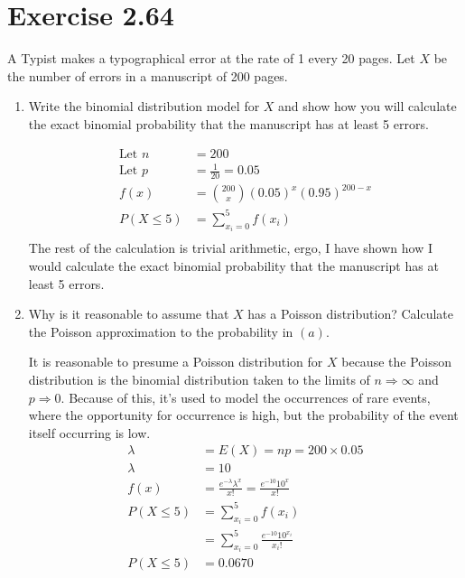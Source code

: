 \documentclass{article}
\begin{document}
\section*{Exercise 2.64}
	A Typist makes a typographical error at the rate of 1 every 20 pages. Let $X$ be the number of errors in a manuscript of 200 pages.
	\begin{enumerate}[\quad(a)]
		\item Write the binomial distribution model for $X$ and show how you will calculate the exact binomial probability that the manuscript has at least 5 errors.
		
		\begin{align*}
			\text{Let } n &= 200\\
			\text{Let } p &= \frac{1}{20} = 0.05\\
			f(x) &= \binom{200}{x} (0.05)^x (0.95)^{200-x}\\
			P(X \leq 5) &= \sum_{x_i = 0}^{5} f(x_i) \\
		\end{align*}
		The rest of the calculation is trivial arithmetic, ergo, I have shown how I would calculate the exact binomial probability that the manuscript has at least 5 errors.
		\item Why is it reasonable to assume that $X$ has a Poisson distribution? Calculate the Poisson approximation to the probability in $(a)$.
		
		It is reasonable to presume a Poisson distribution for $X$ because the Poisson distribution is the binomial distribution taken to the limits of $n \Rightarrow \infty$ and $p \Rightarrow 0$. Because of this, it's used to model the occurrences of rare events, where the opportunity for occurrence is high, but the probability of the event itself occurring is low.
		\begin{align*}
			\lambda &= E(X) = np = 200\times 0.05\\
			\lambda &= 10\\
			f(x) &= \frac{e^{-\lambda}\lambda^x}{x!} = \frac{e^{-10} 10^x}{x!} \\
			P(X \leq 5) &= \sum_{x_i = 0}^{5} f(x_i)\\
			&= \sum_{x_i = 0}^{5} \frac{e^{-10} 10^{x_i}}{x_i!}\\
			P(X \leq 5) &= 0.0670
		\end{align*}
	\end{enumerate}
\end{document}
